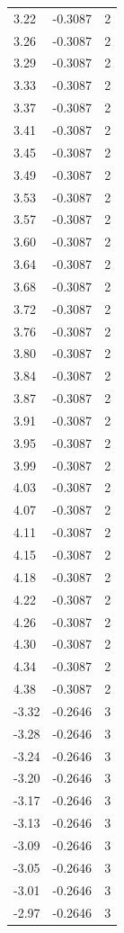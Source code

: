 \begin{longtable}{lrr}
  3.22 & -0.3087 & 2 \\
  3.26 & -0.3087 & 2 \\
  3.29 & -0.3087 & 2 \\
  3.33 & -0.3087 & 2 \\
  3.37 & -0.3087 & 2 \\
  3.41 & -0.3087 & 2 \\
  3.45 & -0.3087 & 2 \\
  3.49 & -0.3087 & 2 \\
  3.53 & -0.3087 & 2 \\
  3.57 & -0.3087 & 2 \\
  3.60 & -0.3087 & 2 \\
  3.64 & -0.3087 & 2 \\
  3.68 & -0.3087 & 2 \\
  3.72 & -0.3087 & 2 \\
  3.76 & -0.3087 & 2 \\
  3.80 & -0.3087 & 2 \\
  3.84 & -0.3087 & 2 \\
  3.87 & -0.3087 & 2 \\
  3.91 & -0.3087 & 2 \\
  3.95 & -0.3087 & 2 \\
  3.99 & -0.3087 & 2 \\
  4.03 & -0.3087 & 2 \\
  4.07 & -0.3087 & 2 \\
  4.11 & -0.3087 & 2 \\
  4.15 & -0.3087 & 2 \\
  4.18 & -0.3087 & 2 \\
  4.22 & -0.3087 & 2 \\
  4.26 & -0.3087 & 2 \\
  4.30 & -0.3087 & 2 \\
  4.34 & -0.3087 & 2 \\
  4.38 & -0.3087 & 2 \\
  -3.32 & -0.2646 & 3 \\
  -3.28 & -0.2646 & 3 \\
  -3.24 & -0.2646 & 3 \\
  -3.20 & -0.2646 & 3 \\
  -3.17 & -0.2646 & 3 \\
  -3.13 & -0.2646 & 3 \\
  -3.09 & -0.2646 & 3 \\
  -3.05 & -0.2646 & 3 \\
  -3.01 & -0.2646 & 3 \\
  -2.97 & -0.2646 & 3 \\

\end{longtable}
